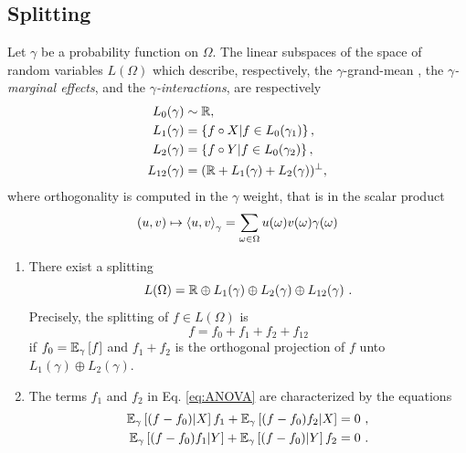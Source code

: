 \documentclass[runningheads]{llncs}
\begin{document}
\subsection{Splitting}
%
Let $\gamma$ be a probability function on $\Omega$. The linear
subspaces of the space of random variables $L(\Omega)$ which describe,
respectively, the $\gamma$-grand-mean , the \emph{$\gamma$-marginal
  effects}, and the \emph{$\gamma$-interactions}, are respectively
%
\begin{equation}\label{eq:ANOVA-spaces}
\begin{aligned}
  L_0(\gamma) &\sim \mathbb R, \\
  L_1(\gamma) &= \left\{ f\circ X \middle| f \in L_0(\gamma_1) \right\},\\
  L_2(\gamma) &= \left\{ f\circ Y \middle| f \in L_0(\gamma_2) \right\},\\
  L_{12}(\gamma) &= (\mathbb R + L_1(\gamma) + L_2(\gamma))^\perp,
\end{aligned}
\end{equation}
%
where orthogonality is computed in the $\gamma$ weight, that is in the scalar product
\begin{equation*}
  (u,v) \mapsto \left\langle u , v \right\rangle_{\gamma} = \sum_{\omega\in\Omega}u(\omega)v(\omega)
  \gamma(\omega)\end{equation*}

\begin{proposition}[ANOVA]
\label{prop:ANOVA}
\begin{enumerate}
\item
There exist a splitting
%
\begin{equation*}
%
  L(\Omega) = \reals \oplus L_1(\gamma) \oplus L_2(\gamma) \oplus L_{12}(\gamma) \ . 
\end{equation*}
%
Precisely, the splitting of $f \in L(\Omega)$ is
%
\begin{equation}
 \label{eq:ANOVA}
 f = f_0 + f_1 + f_2 + f_{12}
\end{equation}
%
 if $f_0={\operatorname{\mathbb E}}_{\gamma}\left[f\right]$ and $f_1+f_2$ is the orthogonal projection of $f$ unto $L_1(\gamma) \oplus L_2(\gamma)$.
\item The terms $f_1$ and $f_2$ in Eq. \eqref{eq:ANOVA} are characterized by the equations
%
\begin{equation}
\label{eq:projetion}
  \begin{aligned}
    \condexpectat \gamma {(f - f_0)} X f_1 + \condexpectat \gamma {(f-f_0)f_2} X &= 0 \ , \\
    \condexpectat \gamma {(f - f_0)f_1} Y + \condexpectat \gamma {(f-f_0)} Y f_2 &= 0 \ .
  \end{aligned}
%
\end{equation}
\end{enumerate}
\end{proposition}
\end{document}
